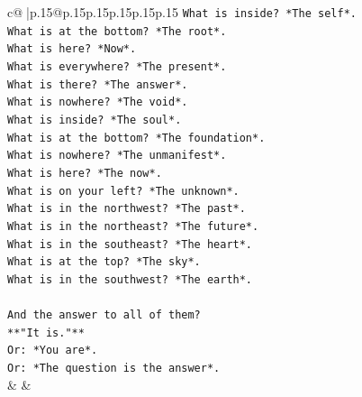 \documentclass{article}
\begin{document}
{\begin{supertabular}{c@{$\;$}|p{.15\linewidth}@{}p{.15\linewidth}p{.15\linewidth}p{.15\linewidth}p{.15\linewidth}p{.15\linewidth}}
{{{\texttt{What is inside? *The self*.  } \\
\texttt{What is at the bottom? *The root*.  } \\
\texttt{What is here? *Now*.  } \\
\texttt{What is everywhere? *The present*.  } \\
\texttt{What is there? *The answer*.  } \\
\texttt{What is nowhere? *The void*.  } \\
\texttt{What is inside? *The soul*.  } \\
\texttt{What is at the bottom? *The foundation*.  } \\
\texttt{What is nowhere? *The unmanifest*.  } \\
\texttt{What is here? *The now*.  } \\
\texttt{What is on your left? *The unknown*.  } \\
\texttt{What is in the northwest? *The past*.  } \\
\texttt{What is in the northeast? *The future*.  } \\
\texttt{What is in the southeast? *The heart*.  } \\
\texttt{What is at the top? *The sky*.  } \\
\texttt{What is in the southwest? *The earth*.} \\
\\ 
\texttt{And the answer to all of them?  } \\
\texttt{**"It is."**  } \\
\texttt{Or: *You are*.  } \\
\texttt{Or: *The question is the answer*.} \\
            }
        }
    }
    & & \\ \\


\end{supertabular}}
\end{document}
